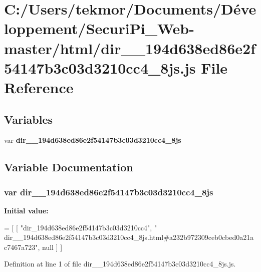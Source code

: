 \section{C\+:/\+Users/tekmor/\+Documents/\+Développement/\+Securi\+Pi\+\_\+\+Web-\/master/html/dir\+\_\+\+\_\+194d638ed86e2f54147b3c03d3210cc4\+\_\+8js.js File Reference}
\label{dir____194d638ed86e2f54147b3c03d3210cc4__8js_8js}
\subsection*{Variables}
\begin{DoxyCompactItemize}
\item 
var {\bf dir\+\_\+\+\_\+194d638ed86e2f54147b3c03d3210cc4\+\_\+8js}
\end{DoxyCompactItemize}


\subsection{Variable Documentation}
\subsubsection[{dir\+\_\+\+\_\+194d638ed86e2f54147b3c03d3210cc4\+\_\+8js}]{\setlength{\rightskip}{0pt plus 5cm}var dir\+\_\+\+\_\+194d638ed86e2f54147b3c03d3210cc4\+\_\+8js}\label{dir____194d638ed86e2f54147b3c03d3210cc4__8js_8js_ab9879b0cabd64c444e1407ab01bb7f1a}
{\bfseries Initial value\+:}
\begin{DoxyCode}
=
[
    [ \textcolor{stringliteral}{"dir\_194d638ed86e2f54147b3c03d3210cc4"}, \textcolor{stringliteral}{"
      dir\_\_194d638ed86e2f54147b3c03d3210cc4\_8js.html#a232b972309ceb0cbed0a21ac7467a723"}, null ]
]
\end{DoxyCode}


Definition at line 1 of file dir\+\_\+\+\_\+194d638ed86e2f54147b3c03d3210cc4\+\_\+8js.\+js.

